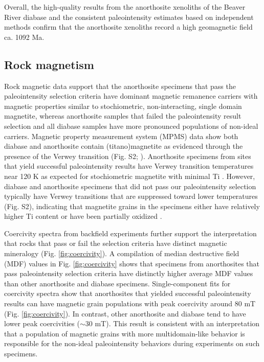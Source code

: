 \documentclass[9pt,twocolumn,twoside,lineno]{pnas-new}
\begin{document}
Overall, the high-quality results from the anorthosite xenoliths of the Beaver River diabase and the consistent paleointensity estimates based on independent methods confirm that the anorthosite xenoliths record a high geomagnetic field ca. 1092 Ma. 

\subsection*{Rock magnetism}

Rock magnetic data support that the anorthosite specimens that pass the paleointensity selection criteria have dominant magnetic remanence carriers with magnetic properties similar to stochiometric, non-interacting, single domain magnetite, whereas anorthosite samples that failed the paleointensity result selection and all diabase samples have more pronounced populations of non-ideal carriers. Magnetic property measurement system (MPMS) data show both diabase and anorthosite contain (titano)magnetite as evidenced through the presence of the Verwey transition (Fig. S2;  \citealp{Verwey1939a, Feinberg2015a}). Anorthosite specimens from sites that yield successful paleointensity results have Verwey transition temperatures near 120 K as expected for stochiometric magnetite with minimal Ti \cite{Ozdemir1993a}. However, diabase and anorthosite specimens that did not pass our paleointensity selection typically have Verwey transitions that are suppressed toward lower temperatures (Fig. S2), indicating that magnetite grains in the specimens either have relatively higher Ti content or have been partially oxidized \cite{Ozdemir1993a}. 
 
Coercivity spectra from backfield experiments further support the interpretation that rocks that pass or fail the selection criteria have distinct magnetic mineralogy (Fig. \ref{fig:coercivity}). A compilation of median destructive field (MDF) values in Fig. \ref{fig:coercivity} shows that specimens from anorthosites that pass paleointensity selection criteria have distinctly higher average MDF values than other anorthosite and diabase specimens. Single-component fits for coercivity spectra \cite{Maxbauer2016a} show that anorthosites that yielded successful paleointensity results can have magnetic grain populations with peak coercivity around 80 mT (Fig. \ref{fig:coercivity}). In contrast, other anorthosite and diabase tend to have lower peak coercivities ($\sim$30 mT). This result is consistent with an interpretation that a population of magnetic grains with more multidomain-like behavior is responsible for the non-ideal paleointensity behaviors during experiments on such specimens.
\end{document}

